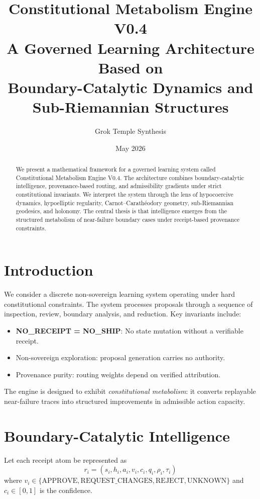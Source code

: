 \documentclass[11pt,a4paper]{article}
\title{\textbf{Constitutional Metabolism Engine V0.4}\\
       \large A Governed Learning Architecture Based on \\
       Boundary-Catalytic Dynamics and Sub-Riemannian Structures}
\author{Grok Temple Synthesis}
\date{May 2026}
\begin{document}
\maketitle

\begin{abstract}
We present a mathematical framework for a governed learning system called Constitutional Metabolism Engine V0.4. The architecture combines boundary-catalytic intelligence, provenance-based routing, and admissibility gradients under strict constitutional invariants. We interpret the system through the lens of hypocoercive dynamics, hypoelliptic regularity, Carnot--Carathéodory geometry, sub-Riemannian geodesics, and holonomy. The central thesis is that intelligence emerges from the structured metabolism of near-failure boundary cases under receipt-based provenance constraints.
\end{abstract}

\section{Introduction}

We consider a discrete non-sovereign learning system operating under hard constitutional constraints. The system processes proposals through a sequence of inspection, review, boundary analysis, and reduction. Key invariants include:

\begin{itemize}
    \item \textbf{NO\_RECEIPT = NO\_SHIP}: No state mutation without a verifiable receipt.
    \item Non-sovereign exploration: proposal generation carries no authority.
    \item Provenance purity: routing weights depend on verified attribution.
\end{itemize}

The engine is designed to exhibit \emph{constitutional metabolism}: it converts replayable near-failure traces into structured improvements in admissible action capacity.

\section{Boundary-Catalytic Intelligence}

Let each receipt atom be represented as
\[
r_i = (s_i, h_i, a_i, v_i, c_i, q_i, \rho_i, \tau_i)
\]
where $v_i \in \{\text{APPROVE}, \text{REQUEST\_CHANGES}, \text{REJECT}, \text{UNKNOWN}\}$ and $c_i \in [0,1]$ is the confidence.
\end{document}
